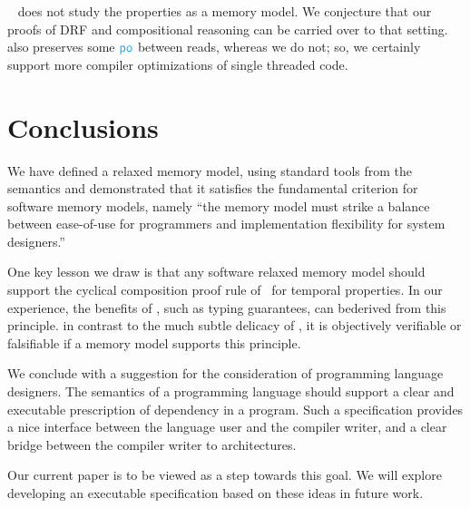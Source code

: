 ~\citet{2019-sp} does not study the properties as a memory model.  We conjecture that our proofs of DRF and compositional reasoning can be carried over to that setting.~\citet{2019-sp} also preserves some $\rpox$ between reads, whereas we do not; so, we certainly support more compiler optimizations of single threaded code. 


\section{Conclusions}
We have defined a relaxed memory model, using standard tools from the semantics and demonstrated that it satisfies the fundamental criterion for software memory models, namely ``the memory model must strike a balance between ease-of-use for programmers and implementation flexibility for system designers.''

One key lesson we draw is that any software relaxed memory model should support the cyclical composition proof rule of~\citet{Abadi:1993:CS:151646.151649}  for temporal properties.   In our experience, the benefits of \oota, such as typing guarantees, can bederived from this principle.   in contrast to the much subtle delicacy of \oota,  it is objectively verifiable or falsifiable if a memory model supports this principle.  

We conclude with a suggestion for the consideration of programming language designers.   The semantics of a programming language should support a clear and executable prescription of dependency in a program.  Such a specification provides a nice interface between the language user and the compiler writer, and  a clear bridge  between the compiler writer to architectures.   

Our current paper is to be viewed as a step towards this goal.  We will explore developing an executable specification based on these ideas in future work.
 



